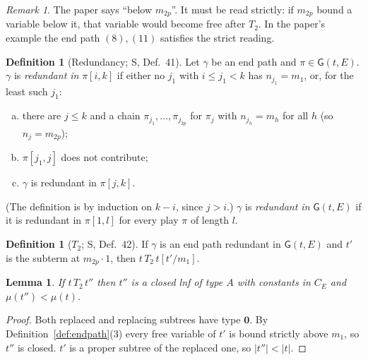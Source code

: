 \documentclass[11pt]{article}
\newcommand{\Ground}{\mathbf{0}}
\newcommand{\Gm}{\mathsf{G}}
\newcommand{\suc}[2]{#1{\cdot}#2}
\newcommand{\iv}[2]{\pi[#1,#2]}
\newcommand{\CE}{C_E}
\theoremstyle{plain}
\newtheorem{lemma}[theorem]{Lemma}
\theoremstyle{definition}
\newtheorem{definition}[theorem]{Definition}
\theoremstyle{remark}
\newtheorem{remark}[theorem]{Remark}
\begin{document}
\begin{remark}
The paper says ``below $m_{2p}$''.  It must be read strictly: if $m_{2p}$
bound a variable below it, that variable would become free after $T_2$.
In the paper's example the end path $(8),(11)$ satisfies the strict
reading.
\end{remark}

\begin{definition}[Redundancy; S, Def.~41]\label{def:redundant}
Let $\gamma$ be an end path and $\pi\in\Gm(t,E)$.  $\gamma$ is
\emph{redundant in} $\iv ik$ if either no $j_1$ with $i\le j_1<k$ has
$n_{j_1}=m_1$, or, for the least such $j_1$:
\begin{enumerate}[(a)]
\item there are $j\le k$ and a chain $\pi_{j_1},\dots,\pi_{j_{2p}}$ for
  $\pi_j$ with $n_{j_h}=m_h$ for all $h$ (so $n_j=m_{2p}$);
\item $\iv{j_1}j$ does not contribute;
\item $\gamma$ is redundant in $\iv jk$.
\end{enumerate}
(The definition is by induction on $k-i$, since $j>i$.)  $\gamma$ is
\emph{redundant in} $\Gm(t,E)$ if it is redundant in $\iv1l$ for every
play $\pi$ of length $l$.
\end{definition}

\begin{definition}[$T_2$; S, Def.~42]
If $\gamma$ is an end path redundant in $\Gm(t,E)$ and $t'$ is the
subterm at $\suc{m_{2p}}1$, then $t\,T_2\,t[t'/m_1]$.
\end{definition}

\begin{lemma}\label{lem:T2-term}
If $t\,T_2\,t''$ then $t''$ is a closed lnf of type $A$ with constants in
$\CE$ and $\mu(t'')<\mu(t)$.
\end{lemma}
\begin{proof}
Both replaced and replacing subtrees have type $\Ground$.  By
Definition~\ref{def:endpath}(3) every free variable of $t'$ is bound
strictly above $m_1$, so $t''$ is closed.  $t'$ is a proper subtree of
the replaced one, so $|t''|<|t|$.
\end{proof}
\end{document}
